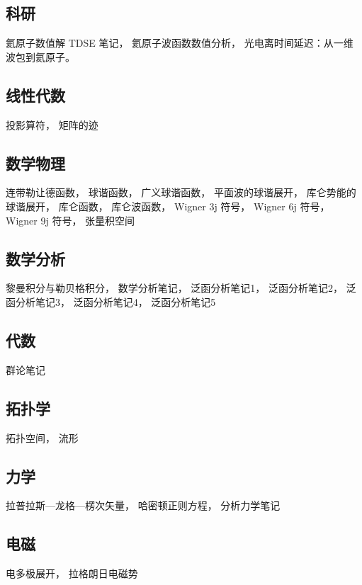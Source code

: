 
\subsection{科研}
氦原子数值解 TDSE 笔记， 氦原子波函数数值分析， 光电离时间延迟：从一维波包到氦原子。

\subsection{线性代数}
投影算符， 矩阵的迹

\subsection{数学物理}
连带勒让德函数， 球谐函数， 广义球谐函数， 平面波的球谐展开， 库仑势能的球谐展开， 库仑函数， 库仑波函数， Wigner 3j 符号， Wigner 6j 符号， Wigner 9j 符号， 张量积空间

\subsection{数学分析}
黎曼积分与勒贝格积分， 数学分析笔记， 泛函分析笔记1， 泛函分析笔记2， 泛函分析笔记3， 泛函分析笔记4， 泛函分析笔记5

\subsection{代数}
群论笔记

\subsection{拓扑学}
拓扑空间， 流形

\subsection{力学}
拉普拉斯—龙格—楞次矢量， 哈密顿正则方程， 分析力学笔记

\subsection{电磁}
电多极展开， 拉格朗日电磁势

